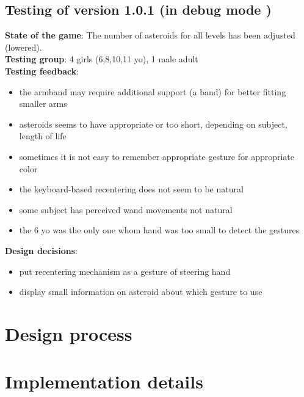 \subsection[Testing of version 1.0.1 (in debug mode)]{Testing of version 1.0.1 (in debug mode \footnotemark[\value{footnote}])}

\textbf{State of the game}: The number of asteroids for all levels has been adjusted (lowered).
\\
\textbf{Testing group}: 4 girls (6,8,10,11 yo), 1 male adult
\\
\textbf{Testing feedback}:
\begin{itemize}
\item the armband may require additional support (a band) for better fitting smaller arms 
\item asteroids seems to have appropriate or too short, depending on subject, length of life
\item sometimes it is not easy to remember appropriate gesture for appropriate color
\item the keyboard-based recentering does not seem to be natural
\item some subject has perceived wand movements not natural
\item the 6 yo was the only one whom hand was too small to detect the gestures
\end{itemize}


\textbf{Design decisions}:
\begin{itemize}
\item put recentering mechanism as a gesture of steering hand
\item display small information on asteroid about which gesture to use
\end{itemize}

\section{Design process}

\section{Implementation details}
